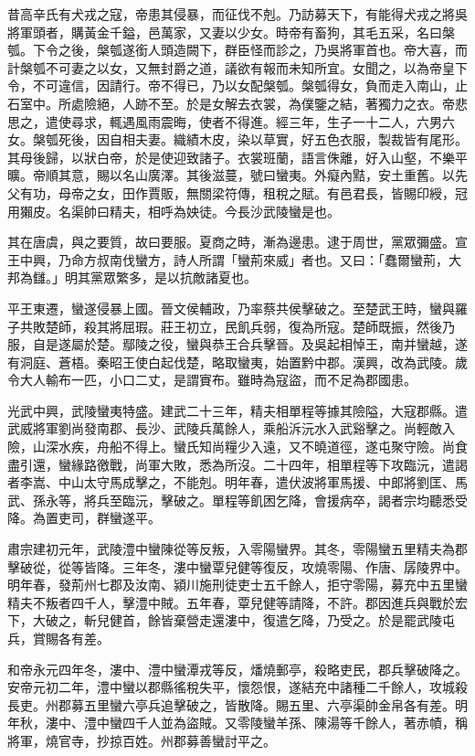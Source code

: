 
\begin{pinyinscope}
昔高辛氏有犬戎之寇，帝患其侵暴，而征伐不剋。乃訪募天下，有能得犬戎之將吳將軍頭者，購黃金千鎰，邑萬家，又妻以少女。時帝有畜狗，其毛五采，名曰槃瓠。下令之後，槃瓠遂銜人頭造闕下，群臣怪而診之，乃吳將軍首也。帝大喜，而計槃瓠不可妻之以女，又無封爵之道，議欲有報而未知所宜。女聞之，以為帝皇下令，不可違信，因請行。帝不得已，乃以女配槃瓠。槃瓠得女，負而走入南山，止石室中。所處險絕，人跡不至。於是女解去衣裳，為僕鑒之結，著獨力之衣。帝悲思之，遣使尋求，輒遇風雨震晦，使者不得進。經三年，生子一十二人，六男六女。槃瓠死後，因自相夫妻。織績木皮，染以草實，好五色衣服，製裁皆有尾形。其母後歸，以狀白帝，於是使迎致諸子。衣裳班蘭，語言侏離，好入山壑，不樂平曠。帝順其意，賜以名山廣澤。其後滋蔓，號曰蠻夷。外癡內黠，安土重舊。以先父有功，母帝之女，田作賈販，無關梁符傳，租稅之賦。有邑君長，皆賜印綬，冠用獺皮。名渠帥曰精夫，相呼為姎徒。今長沙武陵蠻是也。

其在唐虞，與之要質，故曰要服。夏商之時，漸為邊患。逮于周世，黨眾彌盛。宣王中興，乃命方叔南伐蠻方，詩人所謂「蠻荊來威」者也。又曰：「蠢爾蠻荊，大邦為讎。」明其黨眾繁多，是以抗敵諸夏也。

平王東遷，蠻遂侵暴上國。晉文侯輔政，乃率蔡共侯擊破之。至楚武王時，蠻與羅子共敗楚師，殺其將屈瑕。莊王初立，民飢兵弱，復為所寇。楚師既振，然後乃服，自是遂屬於楚。鄢陵之役，蠻與恭王合兵擊晉。及吳起相悼王，南并蠻越，遂有洞庭、蒼梧。秦昭王使白起伐楚，略取蠻夷，始置黔中郡。漢興，改為武陵。歲令大人輸布一匹，小口二丈，是謂賨布。雖時為寇盜，而不足為郡國患。

光武中興，武陵蠻夷特盛。建武二十三年，精夫相單程等據其險隘，大寇郡縣。遣武威將軍劉尚發南郡、長沙、武陵兵萬餘人，乘船泝沅水入武谿擊之。尚輕敵入險，山深水疾，舟船不得上。蠻氏知尚糧少入遠，又不曉道徑，遂屯聚守險。尚食盡引還，蠻緣路徼戰，尚軍大敗，悉為所沒。二十四年，相單程等下攻臨沅，遣謁者李嵩、中山太守馬成擊之，不能剋。明年春，遣伏波將軍馬援、中郎將劉匡、馬武、孫永等，將兵至臨沅，擊破之。單程等飢困乞降，會援病卒，謁者宗均聽悉受降。為置吏司，群蠻遂平。

肅宗建初元年，武陵澧中蠻陳從等反叛，入零陽蠻界。其冬，零陽蠻五里精夫為郡擊破從，從等皆降。三年冬，漊中蠻覃兒健等復反，攻燒零陽、作唐、孱陵界中。明年春，發荊州七郡及汝南、潁川施刑徒吏士五千餘人，拒守零陽，募充中五里蠻精夫不叛者四千人，擊澧中賊。五年春，覃兒健等請降，不許。郡因進兵與戰於宏下，大破之，斬兒健首，餘皆棄營走還漊中，復遣乞降，乃受之。於是罷武陵屯兵，賞賜各有差。

和帝永元四年冬，漊中、澧中蠻潭戎等反，燔燒郵亭，殺略吏民，郡兵擊破降之。安帝元初二年，澧中蠻以郡縣徭稅失平，懷怨恨，遂結充中諸種二千餘人，攻城殺長吏。州郡募五里蠻六亭兵追擊破之，皆散降。賜五里、六亭渠帥金帛各有差。明年秋，漊中、澧中蠻四千人並為盜賊。又零陵蠻羊孫、陳湯等千餘人，著赤幘，稱將軍，燒官寺，抄掠百姓。州郡募善蠻討平之。


\end{pinyinscope}
